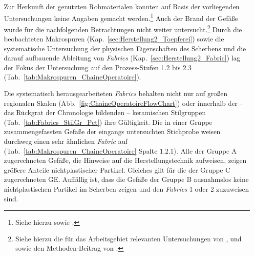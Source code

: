 \begin{figure*}[p]
	\centering
	
	\caption{\textit{Chaîne opératoire}: Prozesskette eines generalisierten Modells der traditionellen Töpferei sowie grobe Prozess-Stufen (rechts; siehe Tab.~\ref{tab:Makrospuren_ChaineOperatoire}).}
	\label{fig:ChaineOperatoireFlowChart}
\end{figure*}


\afterpage{%
	\clearpage
	{\footnotesize
		
	}
}

\vspace{1.5em}
\noindent Zur Herkunft der genutzten Rohmaterialen konnten auf Basis der vorliegenden Untersuchungen keine Angaben gemacht werden.\footnote{Siehe hierzu \textcite{Gosselain.2005} sowie \textcite{Gosselain.2010b}.} Auch der Brand der Gefäße wurde für die nachfolgenden Betrachtungen nicht weiter untersucht.\footnote{Siehe hierzu die für das Arbeitsgebiet relevanten Untersuchungen von \textcite{Wotzka.1991}, \textcite{Gosselain.1992b} und \textcite{LivingstoneSmith.2001} sowie den Methoden-Beitrag von \textcite{LundRasmussen.2012}.} Durch die beobachteten Makrospuren (Kap.~\ref{sec:Herstellung2_Toepferei}) sowie die systematische Untersuchung der physischen Eigenschaften des Scherbens und die darauf aufbauende Ableitung von \textit{Fabrics} (Kap.~\ref{sec:Herstellung2_Fabric}) lag der Fokus der Untersuchung auf den Prozess-Stufen 1.2 bis 2.3 (Tab.~\ref{tab:Makrospuren_ChaineOperatoire}).

Die systematisch herausgearbeiteten \textit{Fabrics} behalten nicht nur auf großen regionalen Skalen (Abb.~\ref{fig:ChaineOperatoireFlowChart}) oder innerhalb der -- das Rückgrat der Chronologie bildenden -- keramischen Stilgruppen (Tab.~\ref{tab:Fabrics_StilGr_Pct}) ihre Gültigkeit. Die in einer Gruppe zusammengefassten Gefäße der eingangs untersuchten Stichprobe weisen durchweg einen sehr ähnlichen \textit{Fabric} auf (Tab.~\ref{tab:Makrospuren_ChaineOperatoire} Spalte 1.2.1). Alle der Gruppe A zugerechneten Gefäße, die Hinweise auf die Herstellungstechnik aufweisen, zeigen größere Anteile nichtplastischer Partikel. Gleiches gilt für die der Gruppe C zugerechneten GE. Auffällig ist, dass die Gefäße der Gruppe B ausnahmslos keine nichtplastischen Partikel im Scherben zeigen und den \textit{Fabrics} 1 oder 2 zuzuweisen sind.  

